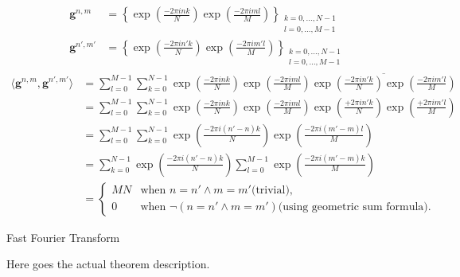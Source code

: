 \begin{Proof}
    \begin{align*} 
        \boldsymbol{g}^{n,m}    &= \left\{\exp\left({\frac{-2\pi ink}{N}}\right)\exp\left({\frac{-2\pi iml}{M}}\right)\right\}_{\substack{k=0,\ldots,N-1\\l=0,\ldots,M-1}}\\
        \boldsymbol{g}^{n',m'}  &= \left\{\exp\left({\frac{-2\pi in'k}{N}}\right)\exp\left({\frac{-2\pi im'l}{M}}\right)\right\}_{\substack{k=0,\ldots,N-1\\l=0,\ldots,M-1}}
    \end{align*}
    \begin{equation*}
        \begin{split}  
            \langle\boldsymbol{g}^{n,m},\boldsymbol{g}^{n',m'}\rangle &= \sum_{l=0}^{M-1}\sum_{k=0}^{N-1} \exp\left({\frac{-2\pi ink}{N}}\right)\exp\left({\frac{-2\pi iml}{M}}\right)\overline{\exp\left({\frac{-2\pi in'k}{N}}\right)\exp\left({\frac{-2\pi im'l}{M}}\right)}\\
            &= \sum_{l=0}^{M-1}\sum_{k=0}^{N-1} \exp\left({\frac{-2\pi ink}{N}}\right)\exp\left({\frac{-2\pi iml}{M}}\right)\exp\left({\frac{+2\pi in'k}{N}}\right)\exp\left({\frac{+2\pi im'l}{M}}\right)\\
            &= \sum_{l=0}^{M-1}\sum_{k=0}^{N-1} \exp\left({\frac{-2\pi i(n'-n)k}{N}}\right)\exp\left({\frac{-2\pi i(m'-m)l}{M}}\right)\\
            &= \sum_{k=0}^{N-1} \exp\left({\frac{-2\pi i(n'-n)k}{N}}\right)\sum_{l=0}^{M-1} \exp\left({\frac{-2\pi i(m'-m)k}{M}}\right)\\
            &= 
            \begin{cases}
                MN & \text{when $n = n' \wedge m=m'$}\text{(trivial)},\\
                0 & \text{when $\neg(n = n' \wedge m=m')$}\text{(using geometric sum formula)}.
            \end{cases}    
        \end{split}
    \end{equation*}
    

    
\end{Proof}



Fast Fourier Transform \cite{Cooley1965} \cite{Good1960} \cite{Frazier1999} \cite{Cormen2022}




\begin{Thm}\label{theorem:dft is unitary}
    
    Here goes the actual theorem description.
\end{Thm}
\begin{Proof}
    
\end{Proof}
















